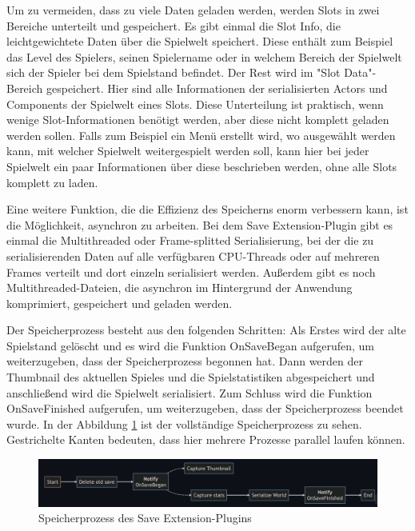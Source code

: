Um zu vermeiden, dass zu viele Daten geladen werden, werden Slots in zwei Bereiche unterteilt und gespeichert. Es gibt einmal die Slot Info, die leichtgewichtete Daten über die Spielwelt speichert. Diese enthält zum Beispiel das Level des Spielers, seinen Spielername oder in welchem Bereich der Spielwelt sich der Spieler bei dem Spielstand befindet. Der Rest wird im "Slot Data"-Bereich gespeichert. Hier sind alle Informationen der serialisierten Actors und Components der Spielwelt eines Slots. Diese Unterteilung ist praktisch, wenn wenige Slot-Informationen benötigt werden, aber diese nicht komplett geladen werden sollen. Falls zum Beispiel ein Menü erstellt wird, wo ausgewählt werden kann, mit welcher Spielwelt weitergespielt werden soll, kann hier bei jeder Spielwelt ein paar Informationen über diese beschrieben werden, ohne alle Slots komplett zu laden.\cite{piperiftPiperiftSaveSlot}

Eine weitere Funktion, die die Effizienz des Speicherns enorm verbessern kann, ist die Möglichkeit, asynchron zu arbeiten. Bei dem Save Extension-Plugin gibt es einmal die Multithreaded oder Frame-splitted Serialisierung, bei der die zu serialisierenden Daten auf alle verfügbaren CPU-Threads oder auf mehreren Frames verteilt und dort einzeln serialisiert werden. Außerdem gibt es noch Multithreaded-Dateien, die asynchron im Hintergrund der Anwendung komprimiert, gespeichert und geladen werden.\cite{piperiftPiperiftSaveMultithreaded}

Der Speicherprozess besteht aus den folgenden Schritten: Als Erstes wird der alte Spielstand gelöscht und es wird die Funktion OnSaveBegan aufgerufen, um weiterzugeben, dass der Speicherprozess begonnen hat. Dann werden der Thumbnail des aktuellen Spieles und die Spielstatistiken abgespeichert und anschließend wird die Spielwelt serialisiert. Zum Schluss wird die Funktion OnSaveFinished aufgerufen, um weiterzugeben, dass der Speicherprozess beendet wurde. In der Abbildung \ref{fig:piperiftSaveProcess} ist der vollständige Speicherprozess zu sehen. Gestrichelte Kanten bedeuten, dass hier mehrere Prozesse parallel laufen können.\cite{piperiftSaveProcess}

\begin{figure}[htp]
    \centering
    \includegraphics[width=1\textwidth]{images/piperift_save_process.png}
    \caption{Speicherprozess des Save Extension-Plugins \cite{piperiftSaveProcess}}
    \label{fig:piperiftSaveProcess}
\end{figure}

